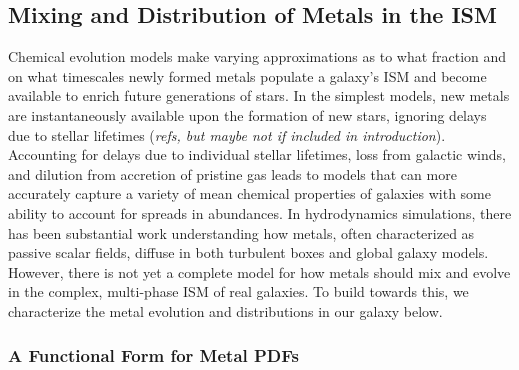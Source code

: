 \documentclass[twocolumn]{aastex61}
\begin{document}
\subsection{Mixing and Distribution of Metals in the ISM}
\label{sec:mixing}

Chemical evolution models make varying approximations as to what fraction and on what timescales newly formed metals populate a galaxy's ISM and become available to enrich future generations of stars. In the simplest models, new metals are instantaneously available upon the formation of new stars, ignoring delays due to stellar lifetimes (\textit{refs, but maybe not if included in introduction}). Accounting for delays due to individual stellar lifetimes, loss from galactic winds, and dilution from accretion of pristine gas leads to models that can more accurately capture a variety of mean chemical properties of galaxies with some ability to account for spreads in abundances. In hydrodynamics simulations, there has been substantial work understanding how metals, often characterized as passive scalar fields, diffuse in both turbulent boxes and global galaxy models. However, there is not  yet a complete model for how metals should mix and evolve in the complex, multi-phase ISM of real galaxies. To build towards this, we characterize the metal evolution and distributions in our galaxy below.


\subsubsection{A Functional Form for Metal PDFs}
\label{sec:log-normal}
\end{document}

